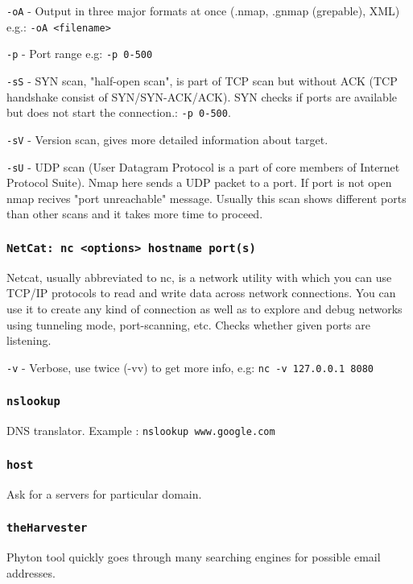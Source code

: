 \documentclass{article}[12pt]
\begin{document}
\texttt{-oA} - Output in three major formats at once (.nmap, .gnmap (grepable), XML) e.g.: \texttt{-oA <filename>}
\newline

\texttt{-p} - Port range e.g: \texttt{-p 0-500}
\newline

\texttt{-sS} - SYN scan, "half-open scan", is part of TCP scan but without ACK (TCP handshake consist of SYN/SYN-ACK/ACK).
SYN checks if ports are available but does not start the connection.: \texttt{-p 0-500}.
\newline

\texttt{-sV} - Version scan, gives more detailed information about target.
\newline

\texttt{-sU} - UDP scan (User Datagram Protocol is a part of core members of Internet Protocol Suite).
Nmap here sends a UDP packet to a port.
If port is not open nmap recives "port unreachable" message.
Usually this scan shows different ports than other scans and it takes more time to proceed.
\newline



\subsubsection{\texttt{NetCat: nc <options> hostname port(s)}}
Netcat, usually abbreviated to nc, is a network utility with which you can use TCP/IP protocols to read and write data across network connections.
You can use it to create any kind of connection as well as to explore and debug networks using tunneling mode, port-scanning, etc.
Checks whether given ports are listening.

\texttt{-v} - Verbose, use twice (-vv) to get more info, e.g: \texttt{nc -v 127.0.0.1  8080}

\subsubsection{\texttt{nslookup}}
DNS translator. Example : \texttt{nslookup www.google.com}

\subsubsection{\texttt{host}}
Ask for a servers for particular domain.

\subsubsection{\texttt{theHarvester}}
Phyton tool quickly goes through many searching engines for possible email addresses.
\newline
\end{document}
